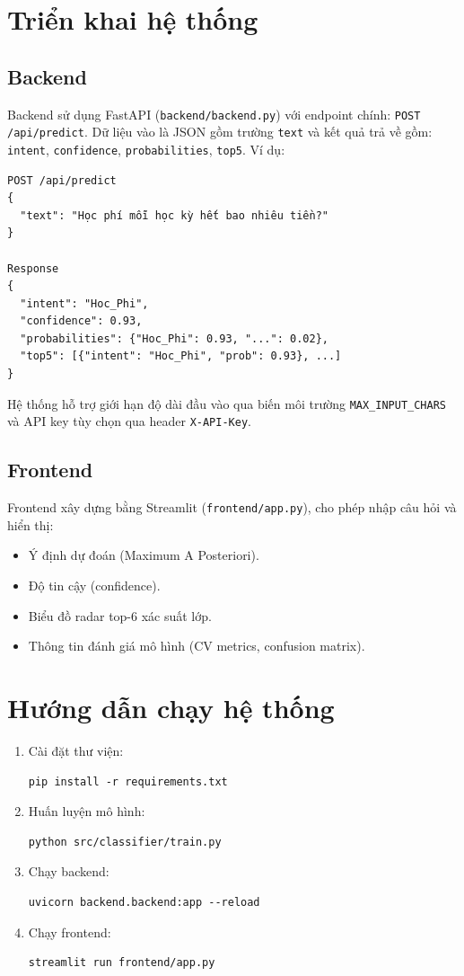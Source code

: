 \documentclass[12pt,a4paper]{article}
\begin{document}
\section{Triển khai hệ thống}
\subsection{Backend}
Backend sử dụng FastAPI (\texttt{backend/backend.py}) với endpoint chính:
\texttt{POST /api/predict}. Dữ liệu vào là JSON gồm trường \texttt{text} và kết quả trả về gồm:
\texttt{intent}, \texttt{confidence}, \texttt{probabilities}, \texttt{top5}. Ví dụ:

\begin{lstlisting}[style=jsonstyle]
POST /api/predict
{
  "text": "Học phí mỗi học kỳ hết bao nhiêu tiền?"
}

Response
{
  "intent": "Hoc_Phi",
  "confidence": 0.93,
  "probabilities": {"Hoc_Phi": 0.93, "...": 0.02},
  "top5": [{"intent": "Hoc_Phi", "prob": 0.93}, ...]
}
\end{lstlisting}

Hệ thống hỗ trợ giới hạn độ dài đầu vào qua biến môi trường \texttt{MAX\_INPUT\_CHARS}
và API key tùy chọn qua header \texttt{X-API-Key}.

\subsection{Frontend}
Frontend xây dựng bằng Streamlit (\texttt{frontend/app.py}), cho phép nhập câu hỏi và hiển thị:
\begin{itemize}
    \item Ý định dự đoán (Maximum A Posteriori).
    \item Độ tin cậy (confidence).
    \item Biểu đồ radar top-6 xác suất lớp.
    \item Thông tin đánh giá mô hình (CV metrics, confusion matrix).
\end{itemize}

\section{Hướng dẫn chạy hệ thống}
\begin{enumerate}
    \item Cài đặt thư viện:
    \begin{lstlisting}[style=jsonstyle]
pip install -r requirements.txt
    \end{lstlisting}
    \item Huấn luyện mô hình:
    \begin{lstlisting}[style=jsonstyle]
python src/classifier/train.py
    \end{lstlisting}
    \item Chạy backend:
    \begin{lstlisting}[style=jsonstyle]
uvicorn backend.backend:app --reload
    \end{lstlisting}
    \item Chạy frontend:
    \begin{lstlisting}[style=jsonstyle]
streamlit run frontend/app.py
    \end{lstlisting}
\end{enumerate}
\end{document}
